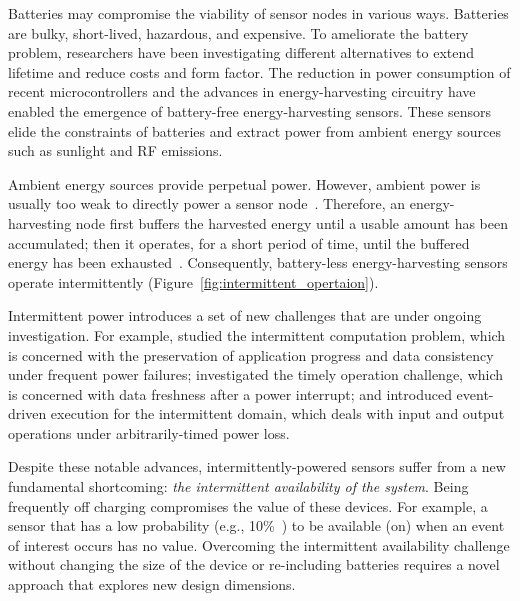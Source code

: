 Batteries may compromise the viability of sensor nodes in various ways. Batteries are bulky, short-lived, hazardous, and expensive. To ameliorate the battery problem, researchers have been investigating different alternatives to extend lifetime and reduce costs and form factor.  
The reduction in power consumption of recent microcontrollers and the advances in energy-harvesting circuitry have enabled the emergence of battery-free energy-harvesting sensors. 
These sensors elide the constraints of batteries and extract power from ambient energy sources such as sunlight and RF emissions. 

Ambient energy sources provide perpetual power. However, ambient power is usually too weak to directly power a sensor node~\cite{liu2013ambient}.  Therefore, an energy-harvesting  node first buffers the harvested energy until a usable amount has been accumulated; then it operates, for a short period of time, until the buffered energy has been exhausted~\cite{lucia2017intermittent}.  Consequently, battery-less energy-harvesting sensors operate intermittently (Figure~\ref{fig:intermittent_opertaion}).

Intermittent power introduces a set of new challenges that are under ongoing investigation.
For example, \cite{lucia2017intermittent,ransford2011mementos,dino,colin2016chain,balsamo2014hibernus} studied the intermittent computation problem, which is concerned with the preservation of application progress and data consistency under frequent power failures; \citet{hester2017timely} investigated the timely operation challenge, which is concerned with data freshness after a power interrupt; 
and \citet{yildirim2018ink} introduced event-driven execution for the intermittent domain, which deals with input and output operations under arbitrarily-timed power loss.

Despite these notable advances, intermittently-powered sensors suffer from a new fundamental shortcoming: \textit{the intermittent availability of the system}. Being frequently off charging compromises the value of these devices. For example, a sensor that has a low probability (e.g., 10\%~\cite{coala}) to be available (on) when an event of interest occurs has no value. 
Overcoming the intermittent availability challenge without changing the size of the device or re-including batteries requires a novel approach that explores new design dimensions. 

